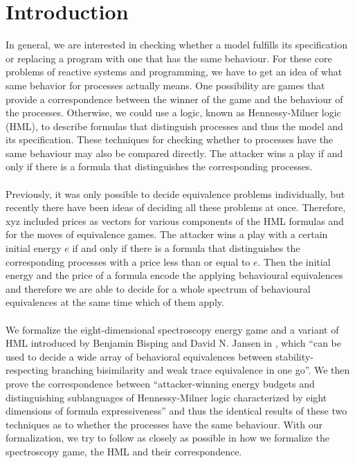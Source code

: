 \newpage
\section{Introduction} %
In general, we are interested in checking whether a model fulfills its specification or replacing a program with one that has the same behaviour.
For these core problems of reactive systems and programming, we have to get an idea of what same behavior for processes actually means.
One possibility are games that provide a correspondence between the winner of the game and the behaviour of the processes.
Otherwise, we could use a logic, known as Hennessy-Milner logic (HML), to describe formulas that distinguish processes and thus the model and its specification.
These techniques for checking whether to processes have the same behaviour may also be compared directly.
The attacker wins a play if and only if there is a formula that distinguishes the corresponding processes.
\\\\
Previously, it was only possible to decide equivalence problems individually, but recently there have been ideas of deciding all these problems at once.
Therefore, xyz included prices as vectors for various components of the HML formulas and for the moves of equivalence games.
The attacker wins a play with a certain initial energy $e$ if and only if there is a formula that distinguishes the corresponding processes with a price less than or equal to $e$.
Then the initial energy and the price of a formula encode the applying behavioural equivalences and therefore we are able to decide for a whole spectrum of behavioural equivalences at the same time which of them apply.
\\\\
We formalize the eight-dimensional spectroscopy energy game and a variant of HML introduced by Benjamin Bisping and David N. Jansen in \cite{bisping2023lineartimebranchingtime}, 
which ``can be used to decide a wide array of behavioral equivalences between stability-respecting branching bisimilarity and weak trace equivalence in one go''\cite{bisping2023lineartimebranchingtime}.
We then prove the correspondence between ``attacker-winning energy budgets and distinguishing sublanguages of Hennessy-Milner logic characterized by eight dimensions of formula expressiveness'' 
and thus the identical results of these two techniques as to whether the processes have the same behaviour.
With our formalization, we try to follow \cite{bisping2023lineartimebranchingtime} as closely as possible in how we formalize the spectroscopy game, the HML and their correspondence.
